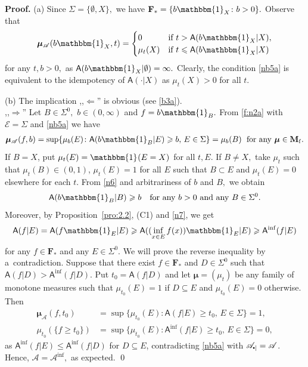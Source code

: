 \documentclass[preprint,11pt]{elsarticle}
\theoremstyle{definition}
\renewenvironment{proof}[1][\textbf{Proof}]{\noindent\textbf{#1.} }{\hfill\qed\vspace{2.5ex}}
\newcommand\bFa{\mathbf{F}_{\ast}} %
\newcommand\bMf{\mathbf{M}_{\mathrm{f}}}%
\newcommand\cE{{\mathcal E}}
\newcommand\sA{\mathsf{A}}
\newcommand\aA[2][E]{\sA(#2|#1)}%
\newcommand\sbullet[1][.5]{\mathbin{\vcenter{\hbox{\scalebox{#1}{$\bullet$}}}}}
\newcommand\bA{\mathscr{A}}%
\newcommand\bpA{\mathscr {A}_{\sbullet|}}%
\newcommand{\bmu}{\boldsymbol{\mu}}
\renewcommand\ge{\geqslant}
\renewcommand\le{\leqslant}
\newcommand{\mI}[1]{\mathbbm{1}_{#1}}%
\begin{document}
\begin{proof}
\noindent (a)
Since $\Sigma=\{\emptyset,X\},$ we have $\bFa=\{b\mI{X}\colon b>0\}.$
Observe that
\[\bmu_{\bA}(b\mI{X},t)
=\begin{cases}
 0 &\text{if } t>\aA[X]{b\mI{X}},\\
 \mu_t(X) &\text{if } t\le \aA[X]{b\mI{X}}
\end{cases}\]
for any $t,b>0,$ as $\sA(b\mI{X}|\emptyset)=\infty.$
Clearly,  the condition \eqref{nb5a} is equivalent to the idempotency of $\sA(\cdot|X)$ as $\mu_t(X)>0$ for all $t$.

\noindent (b) The implication ,,$\Leftarrow$'' is obvious (see \eqref{b3a}).\\
,,$\Rightarrow$''
Let $B\in\Sigma^0,$ $b\in (0,\infty)$ and $f=b\mI{B}.$
From \eqref{f:n2a} with $\cE=\Sigma$ and \eqref{nb5a}
we have
\begin{align}\label{n6}
    \bmu_{\bA}(f,b)=\sup\{\mu_b(E)\colon \aA{b\mI{B}}\ge b,\,E\in \Sigma\}=\mu_b(B)\; \text{ for any } \bmu\in\bMf.
\end{align}
If $B=X$, put $\mu_t(E)=\mI{}(E=X)$ for all $t,E.$ If $B\neq X,$ take $\mu_t$ such that $\mu_t(B)\in (0,1)$, $\mu_t(E)=1$ for all $E$ such that $B\subset E$ and $\mu_t(E)=0$ elsewhere for each $t.$ From  \eqref{n6} and arbitrariness of $b$ and $B,$ we obtain
\begin{align}\label{n7}
  \sA(b\mI{B}|B)\ge b \quad \text{for any } b>0 \text{ and  any } B\in \Sigma^0.
\end{align}
Moreover, by Proposition~\ref{pro:2.2}, (C1) and \eqref{n7}, we get
\begin{align*}
    \aA{f}=\aA{f\mI{E}}\ge \aA{(\inf_{x\in E}f(x))\mI{E}} \ge \sA^{\inf}(f|E)
\end{align*}
for any $f\in\bFa$ and any $E\in\Sigma^0.$ We will prove  the reverse inequality  by a~contradiction.
Suppose that there exist  $f\in\bFa$ and $D\in\Sigma^0$ such that $\aA[D]{f}>\sA^{\inf}(f|D).$
Put $t_0=\aA[D]{f}$ and let $\bmu=(\mu_t)$ be any family of monotone measures such that  $\mu_{t_0}(E)=1$ if $D\subseteq E$ and $\mu_{t_0}(E)=0$ otherwise. Then
\begin{align*}
   \bmu_{\bA}(f,t_0)&= \sup\{\mu_{t_0}(E)\colon \aA{f}\ge t_0,\,E\in\Sigma\}=1,\\
    \mu_{t_0}(\{f\ge t_0\})&=\sup\{\mu_{t_0}(E)\colon \sA^{\inf}(f|E)\ge t_0,\,E\in\Sigma\}=0,
\end{align*}
 as $\sA^{\inf}(f|E)\le \sA^{\inf}(f|D)$ for $D\subseteq E$, contradicting \eqref{nb5a} with $\bpA=\bA$.
Hence, $\bA=\bA^{\inf},$ as expected.
\end{proof}
\end{document}
